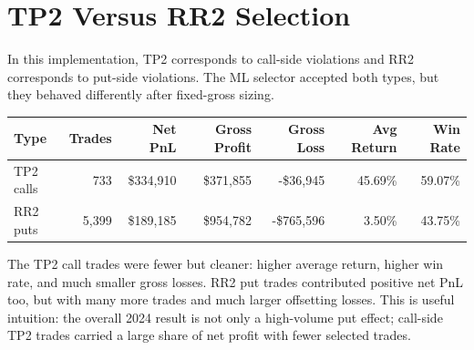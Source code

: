 \documentclass[11pt]{article}
\begin{document}
\section{TP2 Versus RR2 Selection}

In this implementation, TP2 corresponds to call-side violations and RR2 corresponds to put-side violations. The ML selector accepted both types, but they behaved differently after fixed-gross sizing.

\begin{center}
\begin{tabular}{@{}lrrrrrr@{}}
\toprule
Type & Trades & Net PnL & Gross Profit & Gross Loss & Avg Return & Win Rate \\
\midrule
TP2 calls & 733 & \$334,910 & \$371,855 & -\$36,945 & 45.69\% & 59.07\% \\
RR2 puts & 5,399 & \$189,185 & \$954,782 & -\$765,596 & 3.50\% & 43.75\% \\
\bottomrule
\end{tabular}
\end{center}

The TP2 call trades were fewer but cleaner: higher average return, higher win rate, and much smaller gross losses. RR2 put trades contributed positive net PnL too, but with many more trades and much larger offsetting losses. This is useful intuition: the overall 2024 result is not only a high-volume put effect; call-side TP2 trades carried a large share of net profit with fewer selected trades.
\end{document}
